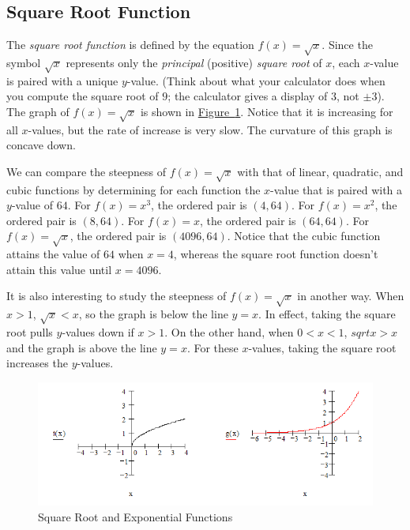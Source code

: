 \documentclass[10pt,]{book}
\theoremstyle{ptxdefinitionnotitle}
\theoremstyle{ptxdefinitiontitle}
\numberwithin{equation}{section}
\newcommand{\lt}{<}
\newcommand{\gt}{>}
\begin{document}
\subsection[{Square Root Function}]{Square Root Function}\label{subsection-6}
\hypertarget{p-46}{}%
The \emph{square root function} is defined by the equation \(f(x) = \sqrt{x}\).  Since the symbol \(\sqrt{x}\) represents only the \emph{principal} (positive) \emph{square root} of \(x\), each \(x\)-value is paired with a unique \(y\)-value.  (Think about what your calculator does when you compute the square root of \(9\); the calculator gives a display of \(3\), not \(\pm 3\)).  The graph of \(f(x) = \sqrt{x}\) is shown in \hyperref[chapter02-section02-root-exp]{Figure~\ref{chapter02-section02-root-exp}}.  Notice that it is increasing for all \(x\)-values, but the rate of increase is very slow.  The curvature of this graph is concave down.%
\par
\hypertarget{p-47}{}%
We can compare the steepness of \(f(x) = \sqrt{x}\) with that of linear, quadratic, and cubic functions by determining for each function the \(x\)-value that is paired with a \(y\)-value of \(64\). For \(f(x) = x^3\), the ordered pair is \(\left( 4, 64 \right)\).    For \(f(x) = x^2\), the ordered pair is \(\left( 8, 64 \right)\). For \(f(x) = x\), the ordered pair is \(\left( 64, 64 \right)\).  For \(f(x) = \sqrt{x}\), the ordered pair is \(\left( 4096, 64 \right)\). Notice that the cubic function attains the value of \(64\) when \(x = 4\), whereas the square root function doesn't attain this value until \(x = 4096\).%
\par
\hypertarget{p-48}{}%
It is also interesting to study the steepness of \(f(x) = \sqrt{x}\) in another way.  When \(x \gt 1\), \(\sqrt{x} \lt x\), so the graph is below the line \(y = x\). In effect, taking the square root pulls \(y\)-values down if \(x \gt 1\). On the other hand, when \(0 \lt x \lt 1\), \(sqrt{x} \gt x\) and the graph is above the line \(y = x\).  For these \(x\)-values, taking the square root increases the \(y\)-values.%
\begin{figure}
\centering
\includegraphics[width=1\linewidth]{./src/images/chapter02/chapter02section02-root-exp.png}
\caption{Square Root and Exponential Functions\label{chapter02-section02-root-exp}}
\end{figure}
\typeout{************************************************}
\typeout{************************************************}
\end{document}
